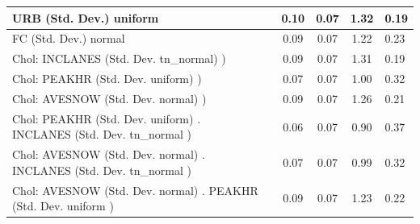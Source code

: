 \begin{table}
\begin{center}
\begin{tabular}{|l|l|c|c|c|l|}
			\hline
			URB (Std. Dev.) uniform &  & 0.10 & 0.07 & 1.32 & 0.19 \\
			\hline
			FC (Std. Dev.) normal &  & 0.09 & 0.07 & 1.22 & 0.23 \\
			\hline
			 Chol: INCLANES (Std. Dev. tn_normal) ) &  & 0.09 & 0.07 & 1.31 & 0.19 \\
			\hline
			 Chol: PEAKHR (Std. Dev. uniform) ) &  & 0.07 & 0.07 & 1.00 & 0.32 \\
			\hline
			 Chol: AVESNOW (Std. Dev. normal) ) &  & 0.09 & 0.07 & 1.26 & 0.21 \\
			\hline
			 Chol: PEAKHR (Std. Dev. uniform) . INCLANES (Std. Dev.   tn_normal ) &  & 0.06 & 0.07 & 0.90 & 0.37 \\
			\hline
			 Chol: AVESNOW (Std. Dev. normal) . INCLANES (Std. Dev.   tn_normal ) &  & 0.07 & 0.07 & 0.99 & 0.32 \\
			\hline
			 Chol: AVESNOW (Std. Dev. normal) . PEAKHR (Std. Dev.   uniform ) &  & 0.09 & 0.07 & 1.23 & 0.22 \\
			\hline
		\end{tabular}
	\end{center}
\end{table}